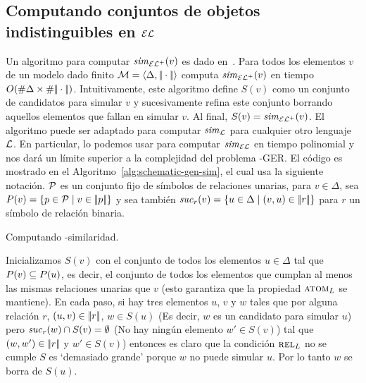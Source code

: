 \subsection{Computando conjuntos de objetos indistinguibles en $\mathcal{EL}$}
\label{sec:indistinguiblesEL}

Un algoritmo para computar ${\it sim}_{{\mathcal{EL}^+}}(v)$ es dado en~\cite{HHK95}. Para todos los
elementos $v$ de un modelo dado finito
$\mathcal{M}=\langle \Delta,|\!|\cdot|\!| \rangle$
computa ${\it sim}_{{\mathcal{EL}^+}}(v)$ en tiempo $O(\# \Delta\times\# {|\!|\cdot|\!|})$.
Intuitivamente, este algoritmo
define $S(v)$ como un conjunto de candidatos para simular $v$ y
sucesivamente refina este conjunto borrando aquellos elementos que fallan en simular $v$.
Al final, $S(v)={\it sim}_{\mathcal{EL}^+}(v)$. El algoritmo puede ser adaptado para
computar ${\it sim}_{\mathcal{L}}$ para cualquier otro lenguaje $\mathcal{L}$. En particular,
lo podemos usar para computar ${\it sim}_\mathcal{EL}$ en tiempo polinomial y nos dar\'a un l\'imite superior a la
complejidad del problema \EL-GER. 
El c\'odigo es mostrado en el
Algoritmo~\ref{alg:schematic-gen-sim}, el cual usa la siguiente
notaci\'on. $\mathcal{P}$ es un conjunto fijo de s\'imbolos de relaciones unarias, para $v\in
\Delta$, sea $P(v)=\{p\in\mathcal{P}\mid v\in|\!|p|\!|\}$ y sea tambi\'en
${\it suc}_{r}(v)=\{u\in\Delta\mid(v,u)\in|\!|r|\!|\}$ para $r$ un s\'imbolo de relaci\'on binaria.\\



\begin{megaalgorithm}
\small

\caption{ Computando \EL-similaridad.}\label{alg:schematic-gen-sim}


 \BlankLine



\end{megaalgorithm}

Inicializamos $S(v)$ con
el conjunto de todos los elementos $u\in\Delta$ tal que $P(v)\subseteq
P(u)$, es decir, el conjunto de todos los elementos que cumplan al menos las
mismas relaciones unarias que $v$ (esto garantiza que la propiedad $\textsc{atom}_L$ se mantiene).
En cada paso, si hay tres elementos $u$, $v$ y $w$ tales que
por alguna relaci\'on $r$, $(u,v) \in |\!|r|\!|$, $w\in S(u)$
(Es decir, $w$ es un candidato para simular $u$) pero ${\it suc}_{r}(w)\cap S(v) = \emptyset$
(No hay ning\'un elemento $w'\in S(v)$) tal que $(w, w') \in |\!|r|\!|$
y $w'\in S(v)$) entonces es claro que la condici\'on $\textsc{rel}_L$ no se cumple $S$ es `demasiado grande' porque
$w$ no puede simular $u$. Por lo tanto $w$ se borra de $S(u)$.


